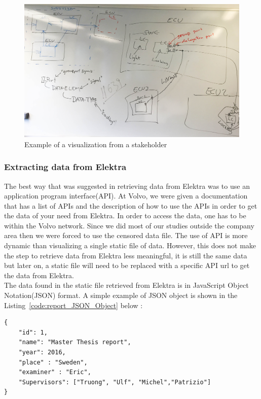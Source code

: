 \begin{figure}[H]
\centering
\captionsetup{justification=centering}
\vspace{0cm}%
\includegraphics[width=0.85\linewidth]{figure/misc/Hakan.jpg}
\caption{Example of a visualization from a stakeholder}
\label{fig:hakan-diagram-board}
\end{figure}

\subsubsection{Extracting data from Elektra}
The best way that was suggested in retrieving data from Elektra was to use an application program interface(API). At Volvo, we were given a documentation that has a list of APIs and the description of how to use the APIs in order to get the data of your need from Elektra. In order to access the data, one has to be within the Volvo network. Since we did most of our studies outside the company area then we were forced to use the censored data file. The use of API is more dynamic than visualizing a single static file of data. However, this does not make the step to retrieve data from Elektra less meaningful, it is still the same data but later on, a static file will need to be replaced with a specific API url to get the data from Elektra.\\

The data found in the static file retrieved from Elektra is in JavaScript Object Notation(JSON) format. A simple example of JSON object is shown in the  Listing~\ref{code:report_JSON_Object} below :

\begin{lstlisting}[caption=An example of JSON object, label=code:report_JSON_Object]
{
    "id": 1,
    "name": "Master Thesis report",
    "year": 2016,
    "place" : "Sweden",
    "examiner" : "Eric",
    "Supervisors": ["Truong", "Ulf", "Michel","Patrizio"]
}
\end{lstlisting}

